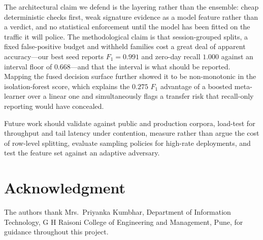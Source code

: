 \documentclass[conference]{IEEEtran}
\begin{document}
The architectural claim we defend is the layering rather than the ensemble: cheap
deterministic checks first, weak signature evidence as a model feature rather than a verdict,
and no statistical enforcement until the model has been fitted on the traffic it will police.
The methodological claim is that session-grouped splits, a fixed false-positive budget and
withheld families cost a great deal of apparent accuracy---our best seed reports $F_1=0.991$
and zero-day recall $1.000$ against an interval floor of $0.668$---and that the interval is
what should be reported. Mapping the fused decision surface further showed it to be
non-monotonic in the isolation-forest score, which explains the $0.275$ $F_1$ advantage of a
boosted meta-learner over a linear one and simultaneously flags a transfer risk that
recall-only reporting would have concealed.

Future work should validate against public and production corpora, load-test for throughput
and tail latency under contention, measure rather than argue the cost of row-level splitting,
evaluate sampling policies for high-rate deployments, and test the feature set against an
adaptive adversary.

\section*{Acknowledgment}
The authors thank Mrs.~Priyanka Kumbhar, Department of Information Technology, G H Raisoni
College of Engineering and Management, Pune, for guidance throughout this project.



\end{document}

